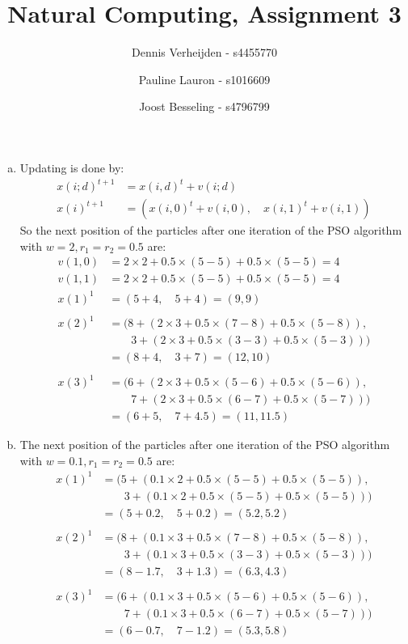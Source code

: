\documentclass[11pt]{article}
\title{Natural Computing, Assignment 3}
\author{Dennis Verheijden - s4455770 \and Pauline Lauron - s1016609 \and Joost Besseling - s4796799}
\begin{document}
\maketitle

\section{}
\begin{enumerate}[(a)]
\item Updating is done by:
\begin{align}
x(i;d)^{t+1} &= x(i,d)^t + v(i;d) \\
x(i)^{t+1} &= (x(i,0)^t + v(i,0), \quad x(i,1)^t + v(i,1)) 
\end{align}
So the next position of the particles after one iteration of the PSO algorithm with $w=2, r_1 = r_2 = 0.5$ are:
\begin{align*}
v(1,0) &= 2 \times 2 + 0.5 \times (5 - 5) + 0.5 \times (5 - 5) = 4 \\
v(1,1) &= 2 \times 2 + 0.5 \times (5 - 5) + 0.5 \times (5 - 5) = 4 \\
x(1)^1 &= (5 + 4, \quad 5 + 4) = (9, 9) \\ \\
x(2)^1 &= (8 + (2 \times 3 + 0.5 \times (7 - 8) + 0.5 \times (5 - 8)), \\
 &\qquad   3 + (2 \times 3 + 0.5 \times (3 - 3) + 0.5 \times (5 - 3))) \\
       &= (8 + 4, \quad 3 + 7) = (12, 10) \\ \\
x(3)^1 &= (6 + (2 \times 3 + 0.5 \times (5 - 6) + 0.5 \times (5 - 6)), \\
 &\qquad   7 + (2 \times 3 + 0.5 \times (6 - 7) + 0.5 \times (5 - 7))) \\
       &= (6 + 5, \quad 7 + 4.5) = (11, 11.5)
\end{align*}

\item The next position of the particles after one iteration of the PSO algorithm with $w=0.1, r_1 = r_2 = 0.5$ are:
\begin{align*}
x(1)^1 &= (5 + (0.1 \times 2 + 0.5 \times (5 - 5) + 0.5 \times (5 - 5)), \\
 &\qquad   3 + (0.1 \times 2 + 0.5 \times (5 - 5) + 0.5 \times (5 - 5))) \\
       &= (5 + 0.2, \quad 5 + 0.2) = (5.2, 5.2) \\ \\
x(2)^1 &= (8 + (0.1 \times 3 + 0.5 \times (7 - 8) + 0.5 \times (5 - 8)), \\
 &\qquad   3 + (0.1 \times 3 + 0.5 \times (3 - 3) + 0.5 \times (5 - 3))) \\
       &= (8 - 1.7, \quad 3 + 1.3) = (6.3, 4.3) \\ \\
x(3)^1 &= (6 + (0.1 \times 3 + 0.5 \times (5 - 6) + 0.5 \times (5 - 6)), \\
 &\qquad   7 + (0.1 \times 3 + 0.5 \times (6 - 7) + 0.5 \times (5 - 7))) \\
       &= (6 - 0.7 , \quad 7 - 1.2) = (5.3, 5.8)
\end{align*}


\end{enumerate}
\end{document}
